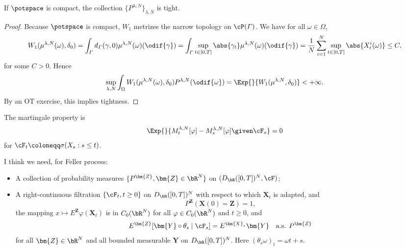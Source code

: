\begin{lemma}
  If $\potspace$ is compact, the collection $\{P^{\lambda, N}\}_{\lambda,N}$ is tight.
\end{lemma}
\begin{proof}
  Because $\potspace$ is compact, $W_1$ metrizes the narrow topology on $\cP(\varGamma)$.
  We have for all $\omega \in \Omega$,
  \begin{equation}
    W_1(\mu^{\lambda, N}(\omega), \delta_0)
    = \int_{\varGamma} d_\varGamma(\gamma,0) \mu^{\lambda,N}(\omega) (\odif{\gamma})
    = \int_{\varGamma} \sup_{t \in [0,T]} \abs{\gamma_t} \mu^{\lambda,N}(\omega) (\odif{\gamma})
    = \frac{1}{N} \sum_{i=1}^N \sup_{t \in [0,T]} \abs{X^i_t(\omega)} \leq C,
  \end{equation}
  for some $C > 0$.
  Hence
  \begin{equation}
    \sup_{\lambda, N} \int_\Omega W_1(\mu^{\lambda, N}(\omega), \delta_0) P^{\lambda, N}(\odif{\omega})
    = \Exp{}{W_1(\mu^{\lambda, N}, \delta_0)} < +\infty.
  \end{equation}
  By an OT exercise, this implies tightness.
\end{proof}



The martingale property is
\begin{equation}
  \Exp{}{M_t^{\lambda, N}[\varphi] - M_s^{\lambda, N}[\varphi] \given \cF_s} = 0
\end{equation}
for $\cF_t \coloneqq \sigma(X_s : s \leq t)$.


I think we need, for Feller process:
\begin{itemize}
  \item A collection of probability measures $\{P^\bm{Z}, \bm{Z} \in \bR^N\}$ on $(D_\bR([0,T])^N, \cF)$;

  \item A right-continuous filtration $\{\cF_t, t \geq 0\}$ on $D_\bR([0,T])^N$ with respect to which $\bm{X}_t$ is adapted, and
        \begin{equation}
          P^\bm{Z}(\bm{X}(0) = \bm{Z}) = 1,
        \end{equation}
        the mapping $x \mapsto E^\bm{Z} \varphi(\bm{X}_t)$ is in $C_0(\bR^N)$ for all $\varphi \in C_0(\bR^N)$ and $t \geq 0$,
        and
        \begin{equation}
          E^\bm{Z}[ \bm{Y} \circ \theta_s \mid \cF_s] = E^{\bm{X}_s} \bm{Y} \quad \text{a.s. } P^\bm{Z}
        \end{equation}
        for all $\bm{Z} \in \bR^N$ and all bounded measurable $\bm{Y}$ on $D_\bR([0,T])^N$. Here $(\theta_s\omega)_t = \omega{t+s}$.
\end{itemize}